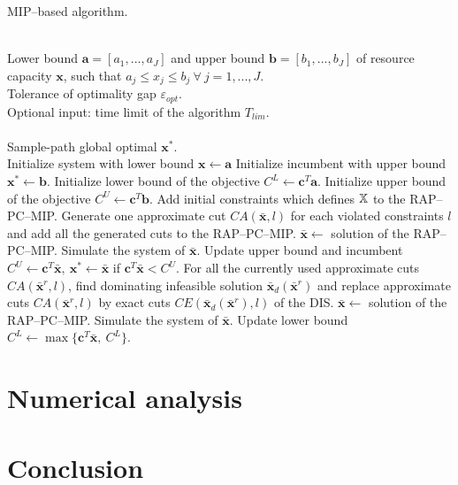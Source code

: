 \documentclass[]{interact}
\theoremstyle{plain}%
\theoremstyle{definition}
\theoremstyle{remark}
\begin{document}
\begin{algorithm}[h]
	\label{algo:}
	\caption{MIP--based algorithm.}
	\begin{algorithmic}[1]
		\REQUIRE ~~\\
		Lower bound $\mathbf{a}=[a_1,...,a_J]$ and upper bound $\mathbf{b}=[b_1,...,b_J]$ of resource capacity $\mathbf{x}$, such that $a_j\le x_j\le b_j\ \forall\ j=1,...,J$. \\
		Tolerance of optimality gap $\varepsilon_{opt}$.\\
		Optional input: time limit of the algorithm $T_{lim}$.\\
		\ENSURE ~~\\
		Sample-path global optimal $\mathbf{x}^*$.\\
		\STATE Initialize system with lower bound $\mathbf{x}\leftarrow\mathbf{a}$
		\STATE Initialize incumbent with upper bound $\mathbf{x}^*\leftarrow\mathbf{b}$. 
		\STATE Initialize lower bound of the objective $C^{L}\leftarrow\mathbf{c}^T\mathbf{a}$.
		\STATE Initialize upper bound of the objective $C^{U}\leftarrow\mathbf{c}^T\mathbf{b}$.
		\STATE Add initial constraints which defines $\Bbb{X}$ to the RAP--PC--MIP.
		\STATE Generate one approximate cut $CA(\bar{\mathbf{x}},l)$ for each violated constraints $l$ and add all the generated cuts to the RAP--PC--MIP.
		\STATE $\bar{\mathbf{x}}\leftarrow$ solution of the RAP--PC--MIP.
		\STATE Simulate the system of $\bar{\mathbf{x}}$.
		\ENDWHILE
		\STATE Update upper bound and incumbent $C^{U}\leftarrow\mathbf{c}^T\bar{\mathbf{x}},\ \mathbf{x}^*\leftarrow \bar{\mathbf{x}}$ if $\mathbf{c}^T\bar{\mathbf{x}}< C^{U}$.
		\STATE For all the currently used approximate cuts $CA(\bar{\mathbf{x}}^r,l)$, find dominating infeasible solution $\bar{\mathbf{x}}_d(\bar{\mathbf{x}}^r)$ and replace approximate cuts $CA(\bar{\mathbf{x}}^r,l)$ by exact cuts $CE(\bar{\mathbf{x}}_d(\bar{\mathbf{x}}^r),l)$ of the DIS.
		\STATE $\bar{\mathbf{x}}\leftarrow$ solution of the RAP--PC--MIP.
		\STATE Simulate the system of $\bar{\mathbf{x}}$.
		\STATE Update lower bound $C^L\leftarrow \max\{\mathbf{c}^T\bar{\mathbf{x}},\ C^L\}$.
		\ENDIF	
		\ENDWHILE
	\end{algorithmic}
\end{algorithm}


\section{Numerical analysis}

\section{Conclusion}






\end{document}
